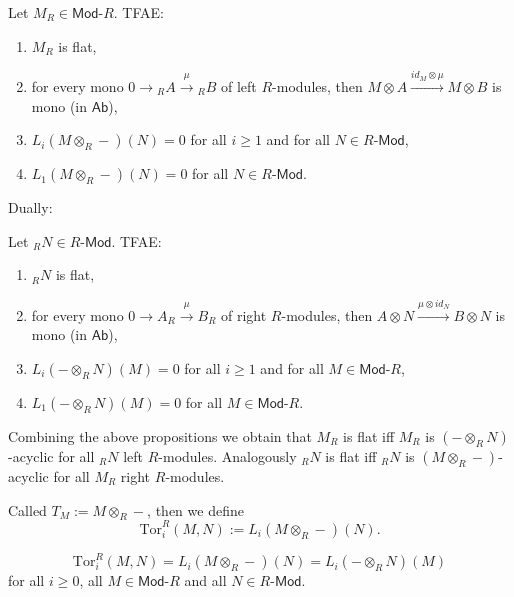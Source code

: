 \begin{prop}
	Let $M_R \in \mathsf{Mod}\text{-}R$.
	TFAE:
	\begin{enumerate}
		\item $M_R$ is flat,
		\item for every mono $0 \to {}_RA \xrightarrow{\mu} {}_RB$ of left $R$-modules, then
			$M \otimes A \xrightarrow{id_M \otimes \mu} M \otimes B$ is mono (in $\mathsf{Ab}$),
		\item $L_i \left( M \otimes_R - \right) (N) = 0$ for all $i \geq 1$ and for all $N \in R\text{-}\mathsf{Mod}$,
		\item $L_1 \left( M \otimes_R - \right) (N) = 0$ for all $N \in R\text{-}\mathsf{Mod}$.
	\end{enumerate}
\end{prop} 
Dually:
\begin{prop}
	Let ${}_RN \in R \text{-}\mathsf{Mod}$.
	TFAE:
	\begin{enumerate}
		\item ${}_RN$ is flat,
		\item for every mono $0 \to A_R \xrightarrow{\mu} B_R$ of right $R$-modules, then
			$A \otimes N \xrightarrow{\mu \otimes id_N} B \otimes N$ is mono (in $\mathsf{Ab}$),
		\item $L_i \left( - \otimes_R N\right) (M) = 0$ for all $i \geq 1$ and for all $M \in \mathsf{Mod}\text{-}R$,
		\item $L_1 \left( - \otimes_R N \right) (M) = 0$ for all $M \in \mathsf{Mod}\text{-}R$.
	\end{enumerate}
\end{prop} 

\begin{rem}[]
	Combining the above propositions we obtain that
	$M_R$ is flat iff $M_R$ is $\left( - \otimes_R N \right)$-acyclic for all ${}_R N$ left $R$-modules.
	Analogously ${}_RN$ is flat iff ${}_RN$ is $\left( M \otimes_R - \right)$-acyclic for all $M_R$ right $R$-modules.
\end{rem}

\begin{defn}[Notation]
	Called $T_M := M \otimes_R -$, then we define
	\begin{equation}
		\mathrm{Tor}^R_i (M,N) := L_i \left( M \otimes_R - \right) (N)
	.\end{equation} 
\end{defn}

\begin{thm}
	\begin{equation}
		\mathrm{Tor}_i^R(M,N) = L_i \left( M \otimes_R - \right)(N) =
		L_i \left( - \otimes_R N \right)(M)
	\end{equation}
	for all $i \geq 0$, all $M \in \mathsf{Mod}\text{-}R$ and all $N \in R\text{-}\mathsf{Mod}$.
\end{thm}

